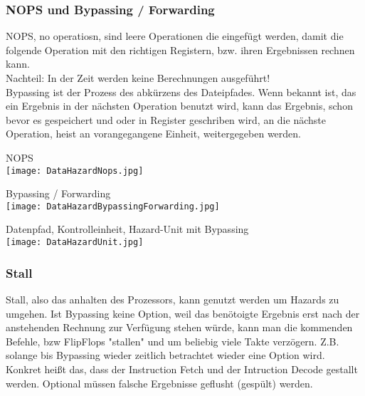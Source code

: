 			\subsubsection{NOPS und Bypassing / Forwarding}
				NOPS, no operatiosn, sind leere Operationen die eingefügt werden, damit die folgende Operation
				mit den richtigen Registern, bzw. ihren Ergebnissen rechnen kann. \\
				Nachteil: In der Zeit werden keine Berechnungen ausgeführt! \\
				Bypassing ist der Prozess des abkürzens des Dateipfades. Wenn bekannt ist, das ein Ergebnis in der
				nächsten Operation benutzt wird, kann das Ergebnis, schon bevor es gespeichert und oder in Register
				geschriben wird, an die nächste Operation, heist an vorangegangene Einheit, weitergegeben werden. \\
				\begin{minipage}{0.5\textwidth}
					\begin{center}
						NOPS \\
						\texttt{[image: DataHazardNops.jpg]}
					\end{center}
				\end{minipage}
				\begin{minipage}{0.45\textwidth}
					\begin{center}
						Bypassing / Forwarding \\
						\texttt{[image: DataHazardBypassingForwarding.jpg]}
					\end{center}
				\end{minipage}
				\vspace{0.3cm}
				\begin{center}
					Datenpfad, Kontrolleinheit, Hazard-Unit mit Bypassing \\
					\texttt{[image: DataHazardUnit.jpg]}
				\end{center}

			
			\subsubsection{Stall}
				Stall, also das anhalten des Prozessors, kann genutzt werden um Hazards zu umgehen.
				Ist Bypassing keine Option, weil das benötoigte Ergebnis erst nach der anstehenden
				Rechnung zur Verfügung stehen würde, kann man die kommenden Befehle, bzw FlipFlops
				"stallen" und um beliebig viele Takte verzögern. Z.B. solange bis Bypassing wieder
				zeitlich betrachtet wieder eine Option wird. \\
				Konkret hei\ss t das, dass der Instruction Fetch und der Intruction Decode gestallt
				werden. Optional müssen falsche Ergebnisse geflusht (gespült) werden. \\

